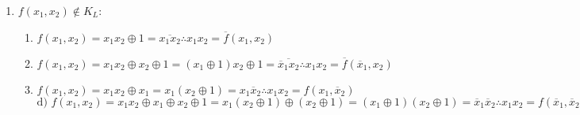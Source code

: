 \documentclass[10pt]{article}
\begin{document}
\begin{enumerate}
    \item $f(x_{1}, x_{2}) \not\in K_{L}$:
        \begin{enumerate}
            \item $f(x_{1}, x_{2}) = x_{1} x_{2} \oplus 1 = \overline {x_{1} x_{2}} \therefore x_{1} x_{2} = \overline f (x_{1}, x_{2})$
            \item $f(x_{1}, x_{2}) = x_{1} x_{2} \oplus x_{2} \oplus 1 = (x_{1} \oplus 1) x_{2} \oplus 1 = \overline {\overline x_{1} x_{2}}\therefore x_{1} x_{2} = \overline f (\overline x_{1}, x_{2})$
            \item $f(x_{1}, x_{2}) = x_{1} x_{2} \oplus x_{1} = x_{1} (x_{2} \oplus 1) = x_{1} \overline x_{2} \therefore x_{1}x_{2} = f(x_{1},\overline x_{2})$$ $$\text{d) } f(x_{1}, x_{2}) = x_{1}x_{2} \oplus x_{1} \oplus x_{2} \oplus 1 = x_{1} (x_{2} \oplus 1) \oplus (x_{2} \oplus 1) = (x_{1} \oplus 1) (x_{2} \oplus 1) = \overline x_{1} \overline x_{2} \therefore x_{1} x_{2} = f(\overline x_{1}, \overline x_{2})$
        \end{enumerate}
\end{enumerate}
\end{document}
